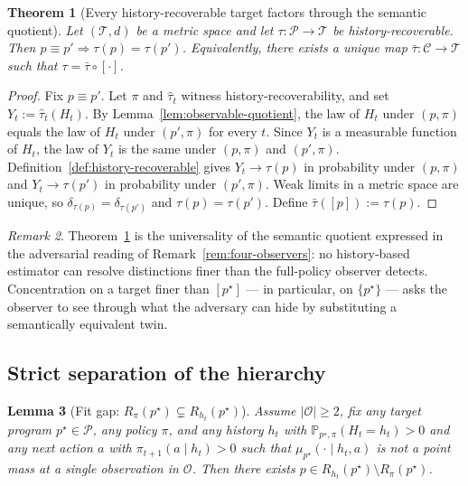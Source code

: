 \documentclass[11pt]{article}
\newtheorem{theorem}{Theorem}[section]
\newtheorem{lemma}[theorem]{Lemma}
\theoremstyle{definition}
\theoremstyle{remark}
\newtheorem{remark}[theorem]{Remark}
\newcommand{\Ccal}{\mathcal{C}}
\newcommand{\Ocal}{\mathcal{O}}
\newcommand{\Pcal}{\mathcal{P}}
\newcommand{\Prob}{\mathbb{P}}
\begin{document}
\begin{theorem}[Every history-recoverable target factors through the semantic quotient]
\label{thm:factor-through-quotient}
Let $(\mathcal{T},d)$ be a metric space and let $\tau:\Pcal\to\mathcal{T}$ be history-recoverable. Then $p\equiv p'\Rightarrow\tau(p)=\tau(p')$. Equivalently, there exists a unique map $\bar\tau:\Ccal\to\mathcal{T}$ such that $\tau=\bar\tau\circ[\cdot]$.
\end{theorem}

\begin{proof}
Fix $p\equiv p'$. Let $\pi$ and $\hat\tau_t$ witness history-recoverability, and set $Y_t:=\hat\tau_t(H_t)$. By Lemma~\ref{lem:observable-quotient}, the law of $H_t$ under $(p,\pi)$ equals the law of $H_t$ under $(p',\pi)$ for every $t$. Since $Y_t$ is a measurable function of $H_t$, the law of $Y_t$ is the same under $(p,\pi)$ and $(p',\pi)$. Definition~\ref{def:history-recoverable} gives $Y_t\to\tau(p)$ in probability under $(p,\pi)$ and $Y_t\to\tau(p')$ in probability under $(p',\pi)$. Weak limits in a metric space are unique, so $\delta_{\tau(p)}=\delta_{\tau(p')}$ and $\tau(p)=\tau(p')$. Define $\bar\tau([p]):=\tau(p)$.
\end{proof}

\begin{remark}
Theorem~\ref{thm:factor-through-quotient} is the universality of the semantic quotient expressed in the adversarial reading of Remark~\ref{rem:four-observers}: no history-based estimator can resolve distinctions finer than the full-policy observer detects. Concentration on a target finer than $[p^\star]$ --- in particular, on $\{p^\star\}$ --- asks the observer to see through what the adversary can hide by substituting a semantically equivalent twin.
\end{remark}

\subsection{Strict separation of the hierarchy}

\begin{lemma}[{Fit gap: $R_\pi(p^\star)\subsetneq R_{h_t}(p^\star)$}]
\label{lem:fit-gap}
Assume $|\Ocal|\ge 2$, fix any target program $p^\star\in\Pcal$, any policy $\pi$, and any history $h_t$ with $\Prob_{p^\star,\pi}(H_t=h_t)>0$ and any next action $a$ with $\pi_{t+1}(a\mid h_t)>0$ such that $\mu_{p^\star}(\cdot\mid h_t,a)$ is not a point mass at a single observation in $\Ocal$. Then there exists $p\in R_{h_t}(p^\star)\setminus R_\pi(p^\star)$.
\end{lemma}
\end{document}
